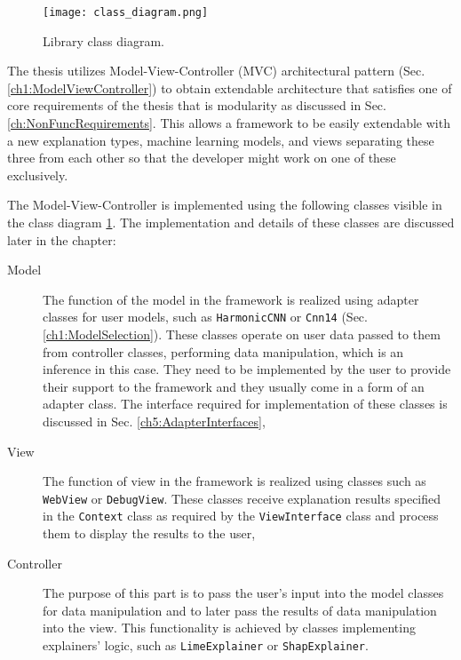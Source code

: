 \documentclass[
    bindingoffset=5mm,  %
    footnoteindent=3mm, %
    hyphenation=true    %
]{src/wut-thesis}
\begin{document}
\begin{figure}%
    \centering
    \texttt{[image: class\_diagram.png]}
    \caption{Library class diagram.}
    \label{fig:ClassDiagram}
\end{figure}

    The thesis utilizes Model-View-Controller (MVC) architectural pattern (Sec. \ref{ch1:ModelViewController}) to obtain extendable architecture that satisfies one of core requirements of the thesis that is modularity as discussed in Sec. \ref{ch:NonFuncRequirements}. This allows a framework to be easily extendable with a new explanation types, machine learning models, and views separating these three from each other so that the developer might work on one of these exclusively.

    The Model-View-Controller is implemented using
    the following classes visible in the class diagram \ref{fig:ClassDiagram}. The implementation and details of these classes are discussed later in the chapter:
    \begin{description}
        \item[Model] The function of the model in the framework is realized using adapter classes for user
        models, such as \texttt{HarmonicCNN} or \texttt{Cnn14} (Sec. \ref{ch1:ModelSelection}). These classes
        operate on user data passed to them from controller classes, performing data manipulation, which is an
        inference in this case. They need to be implemented by the user to provide their support to the framework and they usually come in a form of an adapter class.
        The interface required for implementation of these classes is discussed     
        in Sec. \ref{ch5:AdapterInterfaces},

        \item[View] The function of view in the framework is realized using classes such as \texttt{WebView}
        or \texttt{DebugView}. These classes receive explanation results specified in the \texttt{Context}
        class as required by the \texttt{ViewInterface} class and process them to display the results
        to the user,

        \item[Controller] The purpose of this part is to pass the user’s input into the model
        classes for data manipulation and to later pass the results of data manipulation into 
        the view. This functionality is achieved by classes implementing explainers' logic, 
        such as \texttt{LimeExplainer} or \texttt{ShapExplainer}.
    \end{description}
\end{document}
